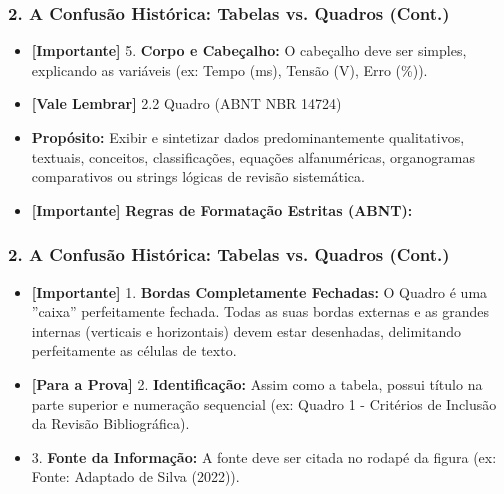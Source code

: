 \documentclass[10pt, aspectratio=169]{slidesiffmodelo}
\begin{document}
\begin{frame}[t]
    \frametitle{\color{iffgold}2. A Confusão Histórica: Tabelas vs. Quadros (Cont.)}
    \begin{itemize}
        \item \textcolor{iffgreen}{\textbf{[Importante]} 5.  \textbf{Corpo e Cabeçalho:} O cabeçalho deve ser simples, explicando as variáveis (ex: Tempo (ms), Tensão (V), Erro (\%)).}
        \item \textcolor{iffblue}{\textbf{[Vale Lembrar]} 2.2 Quadro (ABNT NBR 14724)}
        \item \textbf{Propósito:} Exibir e sintetizar dados predominantemente qualitativos, textuais, conceitos, classificações, equações alfanuméricas, organogramas comparativos ou strings lógicas de revisão sistemática.
        \item \textcolor{iffgreen}{\textbf{[Importante]} \textbf{Regras de Formatação Estritas (ABNT):}}
    \end{itemize}
\end{frame}

\begin{frame}[t]
    \frametitle{\color{iffgold}2. A Confusão Histórica: Tabelas vs. Quadros (Cont.)}
    \begin{itemize}
        \item \textcolor{iffgreen}{\textbf{[Importante]} 1.  \textbf{Bordas Completamente Fechadas:} O Quadro é uma ''caixa'' perfeitamente fechada. Todas as suas bordas externas e as grandes internas (verticais e horizontais) devem estar desenhadas, delimitando perfeitamente as células de texto.}
        \item \textcolor{iffviolet}{\textbf{[Para a Prova]} 2.  \textbf{Identificação:} Assim como a tabela, possui título na parte superior e numeração sequencial (ex: Quadro 1 - Critérios de Inclusão da Revisão Bibliográfica).}
        \item 3.  \textbf{Fonte da Informação:} A fonte deve ser citada no rodapé da figura (ex: Fonte: Adaptado de Silva (2022)).
    \end{itemize}
\end{frame}
\end{document}
